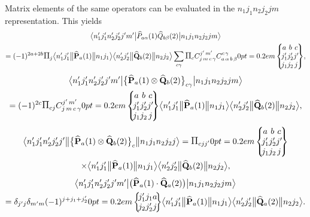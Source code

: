 Matrix elements of the same operators can be evaluated in the \(n_{1} j_{1} n_{2} j_{2} j m\) representation. This yields
\begin{multline}
\braOket{ n_{1}^{\prime} j_{1}^{\prime} n_{2}^{\prime} j_{2}^{\prime} j^{\prime} m^{\prime}}{ \widehat{P}_{a \alpha}(1)  \widehat{Q}_{b \beta}(2)}{n_{1} j_{1} n_{2} j_{2} j m} \\
=(-1)^{2 a+2 b} \Fact{j}
\braOketred{ n_{1}^{\prime} j_{1}^{\prime}}{\widehat{\vect{P}}_{a}(1)}{ n_{1} j_{1}}
\braOketred{ n_{2}^{\prime} j_{2}^{\prime}}{\widehat{\vect{Q}}_{b}(2)}{ n_{2} j_{2}} \sum_{c \gamma} \Fact{c} 
\clebsch{j}{m}{c}{\gamma}{j^{\prime}}{m^{\prime}} 
\clebsch{a}{\alpha}{b}{\beta}{c}{\gamma}
\ninej{a}{b}{c}{j_{1}^{\prime}}{j_{2}^{\prime}}{j^{\prime}}{j_{1}}{j_{2}}{j},  \label{eq:13:1:27}
\end{multline}
\begin{multline}
\braOket{ n_{1}^{\prime} j_{1}^{\prime} n_{2}^{\prime} j_{2}^{\prime} j^{\prime} m^{\prime}}{\bigl\{\widehat{\vect{P}}_{a}(1) \otimes \widehat{\vect{Q}}_{b}(2)\bigr\}_{c \gamma}}{n_{1} j_{1} n_{2} j_{2} j m} \\
=(-1)^{2 c} \Fact{c j} 
\clebsch{j}{m}{c}{\gamma}{j^{\prime}}{m^{\prime}}
\ninej{a}{b}{c}{j_{1}^{\prime}}{j_{2}^{\prime}}{j^{\prime}}{j_{1}}{j_{2}}{j}
\braOketred{ n_{1}^{\prime} j_{1}^{\prime}}{\widehat{\vect{P}}_{a}(1)}{ n_{1} j_{1}}
\braOketred{ n_{2}^{\prime} j_{2}^{\prime}}{\widehat{\vect{Q}}_{b}(2)}{ n_{2} j_{2}},  \label{eq:13:1:28}
\end{multline}
\begin{multline*}
\braOketred{ n_{1}^{\prime} j_{1}^{\prime} n_{2}^{\prime} j_{2}^{\prime} j^{\prime}}{\bigl\{\widehat{\vect{P}}_{a}(1) \otimes \widehat{\vect{Q}}_{b}(2)\bigr\}_{c}}{n_{1} j_{1} n_{2} j_{2} j}
=\Fact{c j j^{\prime}}
\ninej{a}{b}{c}{j_{1}^{\prime}}{j_{2}^{\prime}}{j^{\prime}}{j_{1}}{j_{2}}{j} \\
\times
\braOketred{ n_{1}^{\prime} j_{1}^{\prime}}{\widehat{\vect{P}}_{a}(1)}{ n_{1} j_{1}}
\braOketred{ n_{2}^{\prime} j_{2}^{\prime}}{\widehat{\vect{Q}}_{b}(2)}{ n_{2} j_{2}},
\end{multline*}
\begin{multline}
\braOket{ n_{1}^{\prime} j_{1}^{\prime} n_{2}^{\prime} j_{2}^{\prime} j^{\prime} m^{\prime}}{\bigl(\widehat{\vect{P}}_{a}(1) \cdot \widehat{\vect{Q}}_{a}(2)\bigr)}{n_{1} j_{1} n_{2} j_{2} j m} \\
=\delta_{j^{\prime} j} \delta_{m^{\prime} m}(-1)^{j+j_{1}+j_{2}^{\prime}}
\sixj{j_{1}^{\prime}}{j_{1}}{a}{j_{2}}{j_{2}^{\prime}}{j}
\braOketred{ n_{1}^{\prime} j_{1}^{\prime}}{\widehat{\vect{P}}_{a}(1)}{ n_{1} j_{1}}
\braOketred{ n_{2}^{\prime} j_{2}^{\prime}}{\widehat{\vect{Q}}_{a}(2)}{ n_{2} j_{2}}. \label{eq:13:1:29}
\end{multline}
